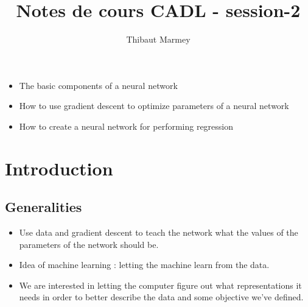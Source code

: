 \documentclass[12pt,a4paper]{article}
\author{Thibaut Marmey}
\title{Notes de cours CADL - session-2}
\begin{document}
	\maketitle

\begin{scriptsize} \begin{itemize}
\item The basic components of a neural network
\item How to use gradient descent to optimize parameters of a neural network
\item How to create a neural network for performing regression
\end{itemize}\end{scriptsize}

\begin{normalsize}
\tableofcontents
\end{normalsize}

\section{Introduction}
\subsection{Generalities}
\begin{itemize}
\item Use data and gradient descent to teach the network what the values of the parameters of the network should be.
\item Idea of machine learning : letting the machine learn from the data.
\item We are interested in letting the computer figure out what representations it needs in order to better describe the data and some objective we've defined.
\end{itemize}
\end{document}
